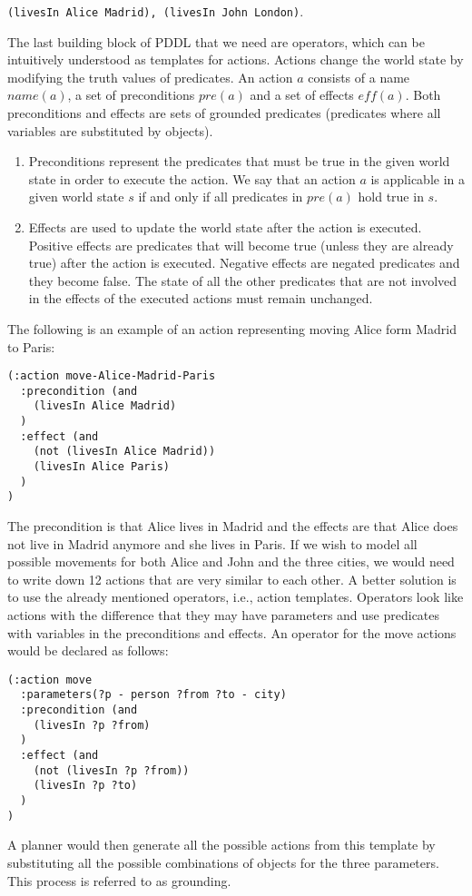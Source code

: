 \documentclass[runningheads]{llncs}
\begin{document}
\verb _(livesIn Alice Madrid), (livesIn John London)_.

The last building block of PDDL that we need are operators, which can be intuitively understood as templates
for actions. Actions change the world state by modifying the truth values of predicates. An action $a$ consists
of a name $name(a)$, a set of preconditions $pre(a)$ and a set of effects $eff(a)$. 
Both preconditions and effects are sets of grounded
predicates (predicates where all variables are substituted by objects). 
\begin{enumerate}
\item Preconditions represent the predicates
that must be true in the given world state in order to execute the action. We say that an action $a$
is applicable in a given world state $s$ if and only if all predicates in $pre(a)$ hold true in $s$.
\item Effects are used to update the world state after the action is executed. Positive effects are
predicates that will become true (unless they are already true) after the action is executed. Negative
effects are negated predicates and they become false. The state of all the other predicates that are not
involved in the effects of the executed actions must remain unchanged.
\end{enumerate}
The following is an example of an action representing moving Alice form Madrid to Paris:
\begin{verbatim}
(:action move-Alice-Madrid-Paris
  :precondition (and
    (livesIn Alice Madrid)
  )
  :effect (and
    (not (livesIn Alice Madrid))
    (livesIn Alice Paris)
  )
)
\end{verbatim}
The precondition is that Alice lives in Madrid and the effects are that Alice does not live in Madrid anymore and
she lives in Paris. If we wish to model all possible movements for both Alice and John and the three cities, we
would need to write down 12 actions that are very similar to each other. A better solution is to use the
already mentioned operators, i.e., action templates. Operators look like actions with the difference that they
may have parameters and use predicates with variables in the preconditions and effects. An operator for
the move actions would be declared as follows:
\begin{verbatim}
(:action move
  :parameters(?p - person ?from ?to - city)
  :precondition (and
    (livesIn ?p ?from)
  )
  :effect (and
    (not (livesIn ?p ?from))
    (livesIn ?p ?to)
  )
)
\end{verbatim}
A planner would then generate all the possible actions from this template by substituting all the possible
combinations of objects for the three parameters. This process is referred to as grounding.
\end{document}
